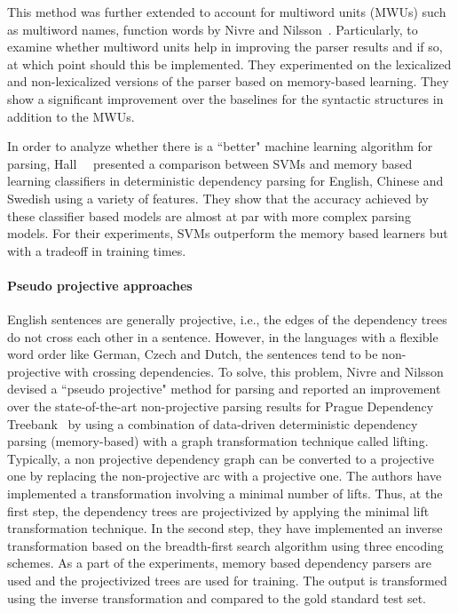 This method was further extended to account for multiword units (MWUs) such as multiword names, function words by Nivre and Nilsson~\cite{nivre2004multiword}. Particularly, to examine whether multiword units help in improving the parser results and if so, at which point should this be implemented. They experimented on the lexicalized and non-lexicalized versions of the parser based on memory-based learning. They show a significant improvement over the baselines for the syntactic structures in addition to the MWUs.

In order to analyze whether there is a ``better" machine learning algorithm for parsing, Hall~\etal~\cite{Hall:2006:DCD:1273073.1273114} presented a comparison between SVMs and memory based learning classifiers in deterministic dependency parsing for English, Chinese and Swedish using a variety of features. They show that the accuracy achieved by these classifier based models are almost at par with more complex parsing models. For their experiments, SVMs outperform the memory based learners but with a tradeoff in training times.

\paragraph{Pseudo projective approaches}

English sentences are generally projective, i.e., the edges of the dependency trees do not cross each other in a sentence. However, in the languages with a flexible word order like German, Czech and Dutch, the sentences tend to be non-projective with crossing dependencies. To solve, this problem, Nivre and Nilsson~\cite{nivre2005pseudo} devised a ``pseudo projective" method for parsing and reported an improvement over the state-of-the-art non-projective parsing results for Prague Dependency Treebank~\cite{bohmova2003prague,hajic1998building} by using a combination of data-driven deterministic dependency parsing (memory-based) with a graph transformation technique called lifting. Typically, a non projective dependency graph can be converted to a projective one by replacing the non-projective arc with a projective one. The authors have implemented a transformation involving a minimal number of lifts. Thus, at the first step, the dependency trees are projectivized by applying the minimal lift transformation technique. In the second step, they have implemented an inverse transformation based on the breadth-first search algorithm using three encoding schemes. As a part of the experiments, memory based dependency parsers are used and the projectivized trees are used for training. The output is transformed using the inverse transformation and compared to the gold standard test set.

